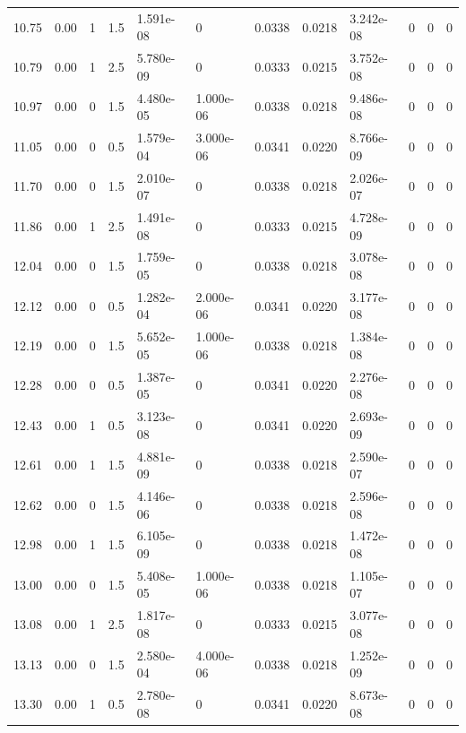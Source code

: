 \documentclass[preview]{standalone}
\begin{document}
{{{\begin{tabular}{L{1.2cm}C{1.2cm} C{0.3cm}C{0.5cm} C{1.4cm}C{1.4cm} C{1.4cm}C{1.4cm} C{1.6cm}C{1.6cm} C{1.6cm}C{1.6cm}}
  10.75  &  0.00  & 1     & 1.5 &  1.591e-08  & 0  &  0.0338&   0.0218& 3.242e-08 & 0   &  0 & 0  \\ 
  10.79  &  0.00  & 1     & 2.5 &  5.780e-09  & 0  &  0.0333&   0.0215& 3.752e-08 & 0   &  0 & 0  \\ 
  10.97  &  0.00  & 0     & 1.5 &  4.480e-05  & 1.000e-06  &  0.0338&   0.0218& 9.486e-08 & 0   &  0 & 0  \\ 
  11.05  &  0.00  & 0     & 0.5 &  1.579e-04  & 3.000e-06  &  0.0341&   0.0220& 8.766e-09 & 0   &  0 & 0  \\ 
  11.70  &  0.00  & 0     & 1.5 &  2.010e-07  & 0  &  0.0338&   0.0218& 2.026e-07 & 0   &  0 & 0  \\ 
  11.86  &  0.00  & 1     & 2.5 &  1.491e-08  & 0  &  0.0333&   0.0215& 4.728e-09 & 0   &  0 & 0  \\ 
  12.04  &  0.00  & 0     & 1.5 &  1.759e-05  & 0  &  0.0338&   0.0218& 3.078e-08 & 0   &  0 & 0  \\ 
  12.12  &  0.00  & 0     & 0.5 &  1.282e-04  & 2.000e-06  &  0.0341&   0.0220& 3.177e-08 & 0   &  0 & 0  \\ 
  12.19  &  0.00  & 0     & 1.5 &  5.652e-05  & 1.000e-06  &  0.0338&   0.0218& 1.384e-08 & 0   &  0 & 0  \\ 
  12.28  &  0.00  & 0     & 0.5 &  1.387e-05  & 0  &  0.0341&   0.0220& 2.276e-08 & 0   &  0 & 0  \\ 
  12.43  &  0.00  & 1     & 0.5 &  3.123e-08  & 0  &  0.0341&   0.0220& 2.693e-09 & 0   &  0 & 0  \\ 
  12.61  &  0.00  & 1     & 1.5 &  4.881e-09  & 0  &  0.0338&   0.0218& 2.590e-07 & 0   &  0 & 0  \\ 
  12.62  &  0.00  & 0     & 1.5 &  4.146e-06  & 0  &  0.0338&   0.0218& 2.596e-08 & 0   &  0 & 0  \\ 
  12.98  &  0.00  & 1     & 1.5 &  6.105e-09  & 0  &  0.0338&   0.0218& 1.472e-08 & 0   &  0 & 0  \\ 
  13.00  &  0.00  & 0     & 1.5 &  5.408e-05  & 1.000e-06  &  0.0338&   0.0218& 1.105e-07 & 0   &  0 & 0  \\ 
  13.08  &  0.00  & 1     & 2.5 &  1.817e-08  & 0  &  0.0333&   0.0215& 3.077e-08 & 0   &  0 & 0  \\ 
  13.13  &  0.00  & 0     & 1.5 &  2.580e-04  & 4.000e-06  &  0.0338&   0.0218& 1.252e-09 & 0   &  0 & 0  \\ 
  13.30  &  0.00  & 1     & 0.5 &  2.780e-08  & 0  &  0.0341&   0.0220& 8.673e-08 & 0   &  0 & 0  \\ 

\end{tabular}}}}
\end{document}
